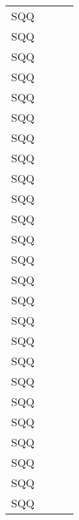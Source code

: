 \documentclass[10pt]{article}
\begin{document}
\begin{tabular}{r l l l}
    SQQ   &                  &              &               \\
    SQQ   &                  &              &               \\
    SQQ   &                  &              &               \\
    SQQ   &                  &              &               \\
    SQQ   &                  &              &               \\
    SQQ   &                  &              &               \\
    SQQ   &                  &              &               \\
    SQQ   &                  &              &               \\
    SQQ   &                  &              &               \\
    SQQ   &                  &              &               \\
    SQQ   &                  &              &               \\
    SQQ   &                  &              &               \\
    SQQ   &                  &              &               \\
    SQQ   &                  &              &               \\
    SQQ   &                  &              &               \\
    SQQ   &                  &              &               \\
    SQQ   &                  &              &               \\
    SQQ   &                  &              &               \\
    SQQ   &                  &              &               \\
    SQQ   &                  &              &               \\
    SQQ   &                  &              &               \\
    SQQ   &                  &              &               \\
    SQQ   &                  &              &               \\
    SQQ   &                  &              &               \\
    SQQ   &                  &              &               \\

    \bottomrule
\end{tabular}
\end{document}
